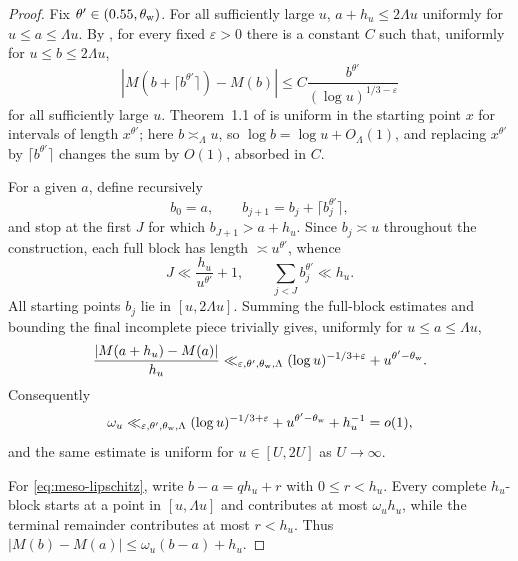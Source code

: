 \documentclass[11pt,reqno]{amsart}
\numberwithin{equation}{section}
\theoremstyle{plain}
\theoremstyle{definition}
\theoremstyle{remark}
\begin{document}
\begin{proof}
Fix $\theta'\in(0.55,\theta_{\rm w})$. For all sufficiently large $u$,
$a+h_u\le2\Lambda u$ uniformly for $u\le a\le\Lambda u$. By
\cite[Theorem~1.1]{MatomakiTeravainen2023}, for every fixed
$\varepsilon>0$ there is a constant $C$ such that, uniformly for
$u\le b\le2\Lambda u$,
\begin{equation}
\left|M\!\left(b+\lceil b^{\theta'}\rceil\right)-M(b)\right|
\le C\frac{b^{\theta'}}{(\log u)^{1/3-\varepsilon}}
\end{equation}
for all sufficiently large $u$. Theorem~1.1 of
\cite{MatomakiTeravainen2023} is uniform in the starting point $x$ for
intervals of length $x^{\theta'}$; here $b\asymp_\Lambda u$, so
$\log b=\log u+O_\Lambda(1)$, and replacing $x^{\theta'}$ by
$\lceil b^{\theta'}\rceil$ changes the sum by $O(1)$, absorbed in $C$.

For a given $a$, define recursively
\begin{equation}
 b_0=a,\qquad b_{j+1}=b_j+\lceil b_j^{\theta'}\rceil,
\end{equation}
and stop at the first $J$ for which $b_{J+1}>a+h_u$. Since
$b_j\asymp u$ throughout the construction, each full block has length
$\asymp u^{\theta'}$, whence
\begin{equation}
 J\ll \frac{h_u}{u^{\theta'}}+1,
 \qquad
 \sum_{j<J}b_j^{\theta'}\ll h_u.
\end{equation}
All starting points $b_j$ lie in $[u,2\Lambda u]$. Summing the full-block
estimates and bounding the final incomplete piece trivially gives,
uniformly for $u\le a\le\Lambda u$,
\begin{equation}
\frac{|M(a+h_u)-M(a)|}{h_u}
\ll_{\varepsilon,\theta',\theta_{\rm w},\Lambda}
(\log u)^{-1/3+\varepsilon}+u^{\theta'-\theta_{\rm w}}.
\end{equation}
Consequently
\begin{equation}
\label{eq:eta-uniform}
\omega_u\ll_{\varepsilon,\theta',\theta_{\rm w},\Lambda}
(\log u)^{-1/3+\varepsilon}+u^{\theta'-\theta_{\rm w}}+h_u^{-1}=o(1),
\end{equation}
and the same estimate is uniform for $u\in[U,2U]$ as $U\to\infty$.

For \eqref{eq:meso-lipschitz}, write $b-a=qh_u+r$ with $0\le r<h_u$.
Every complete $h_u$-block starts at a point in $[u,\Lambda u]$ and
contributes at most $\omega_u h_u$, while the terminal remainder contributes
at most $r<h_u$. Thus
$|M(b)-M(a)|\le\omega_u(b-a)+h_u$.
\end{proof}
\end{document}
